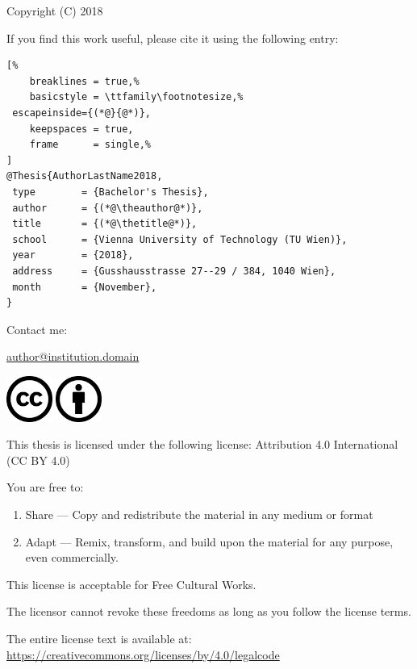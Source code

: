 


Copyright (C) 2018 \theauthor

If you find this work useful, please cite it using the following \BibTeX{ } entry:

\vspace{1em}

\begin{lstlisting}[%
	breaklines = true,%
	basicstyle = \ttfamily\footnotesize,%
 escapeinside={(*@}{@*)},
	keepspaces = true,
	frame      = single,%
]
@Thesis{AuthorLastName2018,
 type        = {Bachelor's Thesis},
 author      = {(*@\theauthor@*)},
 title       = {(*@\thetitle@*)},
 school      = {Vienna University of Technology (TU Wien)},
 year        = {2018},
 address     = {Gusshausstrasse 27--29 / 384, 1040 Wien},
 month       = {November},
}
\end{lstlisting}

\vspace{3em}
Contact me:

\href{E-mail address}{author@institution.domain}

\vfill

\includegraphics[height=1.5cm]{fig/cc-large.png}
\includegraphics[height=1.5cm]{fig/by-large.png}


This thesis is licensed under the following license:
Attribution 4.0 International (CC BY 4.0)

\vspace{3em}

You are free to:

\begin{enumerate}
   \item Share --- Copy and redistribute the material in any medium or format
   \item Adapt --- Remix, transform, and build upon the material for any purpose,
			even commercially.
\end{enumerate}

This license is acceptable for Free Cultural Works.

The licensor cannot revoke these freedoms as long as you follow the license terms.

The entire license text is available at:
\href{https://creativecommons.org/licenses/by/4.0/legalcode}
	{https://creativecommons.org/licenses/by/4.0/legalcode}


